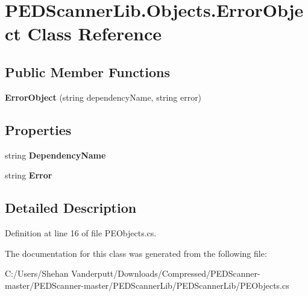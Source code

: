 \hypertarget{class_p_e_d_scanner_lib_1_1_objects_1_1_error_object}{}\section{P\+E\+D\+Scanner\+Lib.\+Objects.\+Error\+Object Class Reference}
\label{class_p_e_d_scanner_lib_1_1_objects_1_1_error_object}
\subsection*{Public Member Functions}
\begin{DoxyCompactItemize}
\item 
\mbox{\label{class_p_e_d_scanner_lib_1_1_objects_1_1_error_object_a0d16e01ee2b3700b16a171edb1d61ca7}} 
{\bfseries Error\+Object} (string dependency\+Name, string error)
\end{DoxyCompactItemize}
\subsection*{Properties}
\begin{DoxyCompactItemize}
\item 
\mbox{\label{class_p_e_d_scanner_lib_1_1_objects_1_1_error_object_a394073acfe0088e73b71caf7646be09e}} 
string {\bfseries Dependency\+Name}
\item 
\mbox{\label{class_p_e_d_scanner_lib_1_1_objects_1_1_error_object_ac58001f4e2bdef45cbda8c240297ddf0}} 
string {\bfseries Error}
\end{DoxyCompactItemize}


\subsection{Detailed Description}


Definition at line 16 of file P\+E\+Objects.\+cs.



The documentation for this class was generated from the following file\+:\begin{DoxyCompactItemize}
\item 
C\+:/\+Users/\+Shehan Vanderputt/\+Downloads/\+Compressed/\+P\+E\+D\+Scanner-\/master/\+P\+E\+D\+Scanner-\/master/\+P\+E\+D\+Scanner\+Lib/\+P\+E\+D\+Scanner\+Lib/P\+E\+Objects.\+cs\end{DoxyCompactItemize}
